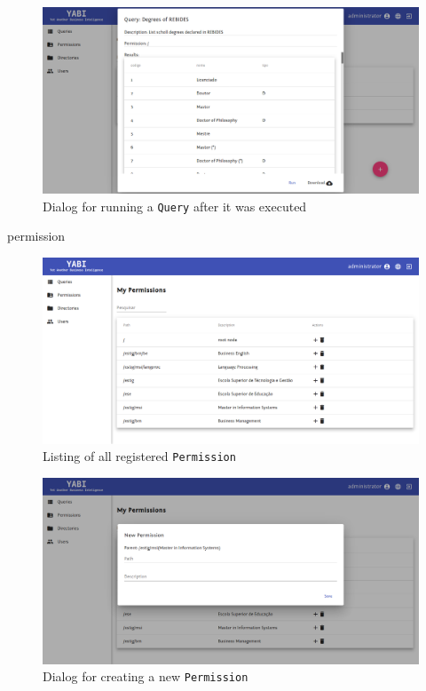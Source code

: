 \begin{figure}
  \centering
  \includegraphics[width=.8\textwidth]{images/screenshots/query/query-post-run}
  \caption{Dialog for running a \texttt{Query} after it was executed}\label{fig:querypostrun}
\end{figure}

permission

\begin{figure}
  \centering
  \includegraphics[width=.8\textwidth]{images/screenshots/permission/permission-listing}
  \caption{Listing of all registered \texttt{Permission}}\label{fig:permissionlist}
\end{figure}

\begin{figure}
  \centering
  \includegraphics[width=.8\textwidth]{images/screenshots/permission/permission-new}
  \caption{Dialog for creating a new \texttt{Permission}}\label{fig:permissionnew}
\end{figure}

